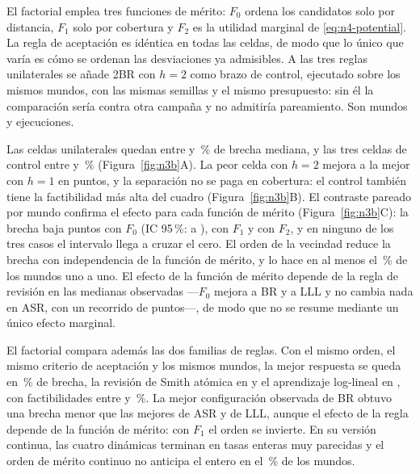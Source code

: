 \documentclass[12pt,a4paper]{article}
\theoremstyle{remark}
\theoremstyle{plain}
\begin{document}
El factorial emplea tres funciones de mérito: $F_0$ ordena los candidatos solo
por distancia, $F_1$ solo por cobertura y $F_2$ es la utilidad marginal de
\eqref{eq:n4-potential}. La regla de aceptación es idéntica en todas las celdas,
de modo que lo único que varía es cómo se ordenan las desviaciones ya
admisibles. A las tres reglas unilaterales se añade 2BR con $h=2$ como brazo de
control, ejecutado sobre los mismos mundos, con las mismas semillas y el mismo
presupuesto: sin él la comparación sería contra otra campaña y no admitiría
pareamiento. Son \NThreeBWorlds{} mundos y \NThreeBRuns{} ejecuciones.

Las \NThreeBUnilateralCells{} celdas unilaterales quedan entre
\NThreeBBestGap{} y \NThreeBWorstGap\,\% de brecha mediana, y las tres celdas de
control entre \NThreeBCtrlBestGap{} y \NThreeBCtrlWorstGap\,\%
(Figura~\ref{fig:n3b}A). La peor celda con $h=2$ mejora a la mejor con $h=1$ en
\NThreeBSeparation{} puntos, y la separación no se paga en cobertura: el control
también tiene la factibilidad más alta del cuadro (Figura~\ref{fig:n3b}B). El
contraste pareado por mundo confirma el efecto para cada función de mérito
(Figura~\ref{fig:n3b}C): la brecha baja \NThreeBPairedFZeroDrop{} puntos con
$F_0$ (IC 95\,\%: \NThreeBPairedFZeroDropLo{} a \NThreeBPairedFZeroDropHi),
\NThreeBPairedFOneDrop{} con $F_1$ y \NThreeBPairedFTwoDrop{} con $F_2$, y en
ninguno de los tres casos el intervalo llega a cruzar el cero. El orden de la vecindad reduce la brecha con
independencia de la función de mérito, y lo hace en al menos el
\NThreeBPairedMinBetterPct\,\% de los mundos uno a uno. El efecto de la función de
mérito depende de la regla de revisión en las medianas observadas ---$F_0$
mejora a BR y a LLL y no cambia nada en ASR, con un recorrido de
\NThreeBInteraction{} puntos---, de modo que no se resume mediante un único
efecto marginal.

El factorial compara además las dos familias de reglas. Con el mismo orden, el
mismo criterio de aceptación y los
mismos mundos, la mejor respuesta se queda en \NThreeBBrBestGap\,\% de brecha,
la revisión de Smith atómica en \NThreeBAsrBestGap{} y el aprendizaje
log-lineal en \NThreeBLllBestGap, con factibilidades entre
\NThreeBBrBestFeas{} y \NThreeBLllBestFeas\,\%. La mejor configuración
observada de BR obtuvo una brecha menor que las mejores de ASR y de LLL, aunque
el efecto de la regla depende de la función de mérito: con $F_1$ el orden se
invierte. En su versión continua, las cuatro dinámicas terminan en tasas enteras
muy parecidas y el orden de mérito continuo no anticipa el entero en el
\NFourFiiMismatchPct\,\% de los mundos.
\end{document}
